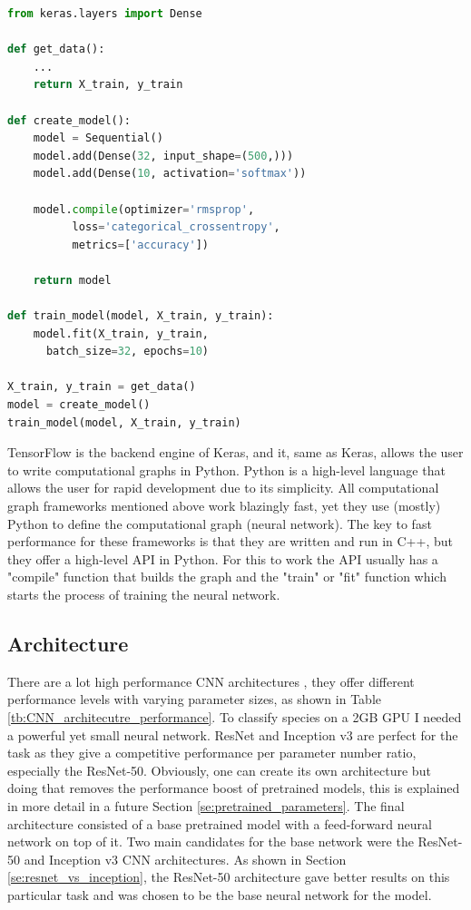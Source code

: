 \documentclass[times, utf8, diplomski]{fer}
\begin{document}
\begin{lstlisting}[language=Python, caption=Keras' high-level API example]
from keras.layers import Dense

def get_data():
    ...
    return X_train, y_train

def create_model():
    model = Sequential()
    model.add(Dense(32, input_shape=(500,)))
    model.add(Dense(10, activation='softmax'))
    
    model.compile(optimizer='rmsprop',
          loss='categorical_crossentropy',
          metrics=['accuracy'])
          
    return model
    
def train_model(model, X_train, y_train):
    model.fit(X_train, y_train,
      batch_size=32, epochs=10)
        
X_train, y_train = get_data()
model = create_model()
train_model(model, X_train, y_train)

\end{lstlisting}

TensorFlow is the backend engine of Keras, and it, same as Keras, allows the user to write computational graphs in Python. Python is a high-level language that allows the user for rapid development due to its simplicity. All computational graph frameworks mentioned above work blazingly fast, yet they use (mostly) Python to define the computational graph (neural network). The key to fast performance for these frameworks is that they are written and run in C++, but they offer a high-level API in Python. For this to work the API usually has a "compile" function that builds the graph and the "train" or "fit" function which starts the process of training the neural network.

\subsection{Architecture}
\label{se:architecture}

There are a lot high performance CNN architectures \citep{he_deep_2016, simonyan_very_2014, szegedy_going_2015}, they offer different performance levels with varying parameter sizes, as shown in Table \ref{tb:CNN_architecutre_performance}. To classify species on a 2GB GPU I needed a powerful yet small neural network. ResNet and Inception v3 are perfect for the task as they give a competitive performance per parameter number ratio, especially the ResNet-50. Obviously, one can create its own architecture but doing that removes the performance boost of pretrained models, this is explained in more detail in a future Section \ref{se:pretrained_parameters}. The final architecture consisted of a base pretrained model with a feed-forward neural network on top of it. Two main candidates for the base network were the ResNet-50 and Inception v3 CNN architectures. As shown in Section \ref{se:resnet_vs_inception}, the ResNet-50 architecture gave better results on this particular task and was chosen to be the base neural network for the model.
\end{document}
